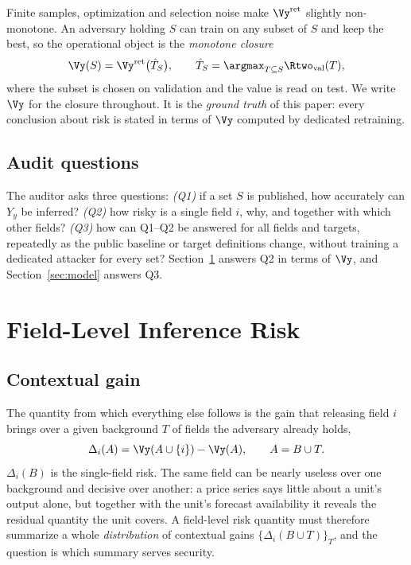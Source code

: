 Finite samples, optimization and selection noise make $\Vy^{\mathrm{ret}}$ slightly
non-monotone. An adversary holding $S$ can train on any subset of $S$ and keep the best, so
the operational object is the \emph{monotone closure}
\begin{equation}\label{eq:closure}
\Vy(S) = \Vy^{\mathrm{ret}}\big(\hat T_S\big), \qquad
\hat T_S = \argmax_{T \subseteq S} \Rtwo_{\mathrm{val}}(T),
\end{equation}
where the subset is chosen on validation and the value is read on test. We write $\Vy$ for
the closure throughout. It is the \emph{ground truth} of this paper: every conclusion about
risk is stated in terms of $\Vy$ computed by dedicated retraining.

\subsection{Audit questions}
The auditor asks three questions: \emph{(Q1)} if a set $S$ is published, how accurately can
$Y_y$ be inferred? \emph{(Q2)} how risky is a single field $i$, why, and together with which
other fields? \emph{(Q3)} how can Q1--Q2 be answered for all fields and targets, repeatedly as
the public baseline or target definitions change, without training a dedicated attacker for
every set? Section~\ref{sec:mk} answers Q2 in terms of $\Vy$, and Section~\ref{sec:model}
answers Q3.

\section{Field-Level Inference Risk}\label{sec:mk}

\subsection{Contextual gain}
The quantity from which everything else follows is the gain that releasing field $i$ brings over a
given background $T$ of fields the adversary already holds,
\begin{equation}\label{eq:delta}
\Delta_i(A)=\Vy(A \cup \{i\}) - \Vy(A),\qquad A=B\cup T .
\end{equation}
$\Delta_i(B)$ is the single-field risk. The same field can be nearly useless over one background
and decisive over another: a price series says little about a unit's output alone, but together
with the unit's forecast availability it reveals the residual quantity the unit covers. A
field-level risk quantity must therefore summarize a whole \emph{distribution} of contextual gains
$\{\Delta_i(B\cup T)\}_T$, and the question is which summary serves security.

